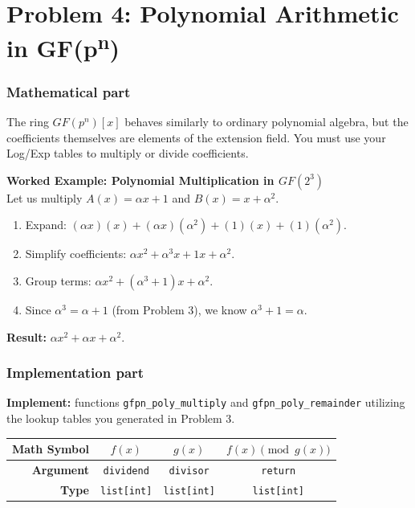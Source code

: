 \documentclass[11pt]{article}
\begin{document}
\section*{Problem 4: Polynomial Arithmetic in GF(p\textsuperscript{n})}

\subsubsection*{Mathematical part}
The ring $GF(p^n)[x]$ behaves similarly to ordinary polynomial algebra, but the coefficients themselves are elements of the extension field. You must use your Log/Exp tables to multiply or divide coefficients.

\textbf{Worked Example: Polynomial Multiplication in $GF(2^3)$} \\
Let us multiply $A(x) = \alpha x + 1$ and $B(x) = x + \alpha^2$.
\begin{enumerate}
    \item Expand: $(\alpha x)(x) + (\alpha x)(\alpha^2) + (1)(x) + (1)(\alpha^2)$.
    \item Simplify coefficients: $\alpha x^2 + \alpha^3 x + 1 x + \alpha^2$.
    \item Group terms: $\alpha x^2 + (\alpha^3 + 1)x + \alpha^2$.
    \item Since $\alpha^3 = \alpha + 1$ (from Problem 3), we know $\alpha^3 + 1 = \alpha$.
\end{enumerate}
\textbf{Result:} $\alpha x^2 + \alpha x + \alpha^2$.

\subsubsection*{Implementation part}
\textbf{Implement:} functions \lstinline|gfpn_poly_multiply| and \lstinline|gfpn_poly_remainder| utilizing the lookup tables you generated in Problem 3.

\begin{center}
\renewcommand{\arraystretch}{2.0}
\begin{tabular}{r | c | c | c}
\toprule
\textbf{Math Symbol} & $f(x)$ & $g(x)$ & $f(x) \pmod{g(x)}$ \\ \midrule
\textbf{Argument} & \lstinline|dividend| & \lstinline|divisor| & \lstinline|return| \\ \midrule
\textbf{Type} & \lstinline|list[int]| & \lstinline|list[int]| & \lstinline|list[int]| \\
\bottomrule
\end{tabular}
\end{center}
\end{document}
